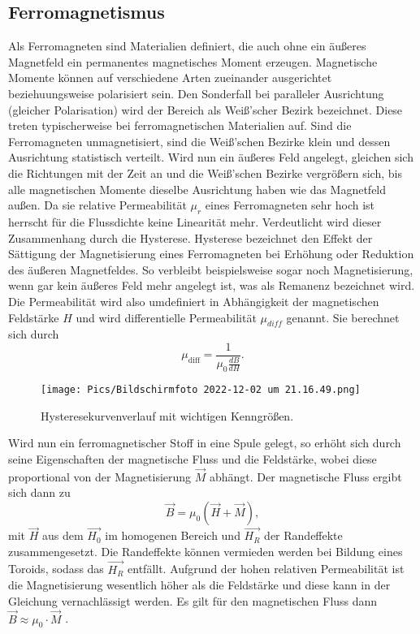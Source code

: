 \documentclass[11pt]{article}
\begin{document}
\subsection{Ferromagnetismus}
Als Ferromagneten sind Materialien definiert, die auch ohne ein äußeres Magnetfeld ein permanentes magnetisches Moment
erzeugen.
Magnetische Momente können auf verschiedene Arten zueinander ausgerichtet beziehuungsweise polarisiert sein.
Den Sonderfall bei paralleler Ausrichtung (gleicher Polarisation) wird der Bereich als Weiß'scher Bezirk bezeichnet.
Diese treten typischerweise bei ferromagnetischen Materialien auf.
Sind die Ferromagneten unmagnetisiert, sind die Weiß'schen Bezirke klein und dessen Ausrichtung statistisch verteilt.
Wird nun ein äußeres Feld angelegt, gleichen sich die Richtungen mit der Zeit an und die Weiß'schen Bezirke vergrößern sich,
bis alle magnetischen Momente dieselbe Ausrichtung haben wie das Magnetfeld außen.
Da sie relative Permeabilität $\mu_{r}$ eines Ferromagneten sehr hoch ist herrscht für die Flussdichte keine Linearität mehr.
Verdeutlicht wird dieser Zusammenhang durch die Hysterese.
Hysterese bezeichnet den Effekt der Sättigung der Magnetisierung eines Ferromagneten bei Erhöhung oder Reduktion des
äußeren Magnetfeldes.
So verbleibt beispielsweise sogar noch Magnetisierung, wenn gar kein äußeres Feld mehr angelegt ist, was als Remanenz
bezeichnet wird.
Die Permeabilität wird also umdefiniert in Abhängigkeit der magnetischen Feldstärke $H$ und wird differentielle
Permeabilität $\mu_{diff}$ genannt.
Sie berechnet sich durch
\begin{equation}
    \mu_{\text{diff}} = \frac{1}{\mu_{0}\frac{dB}{dH}} .
    \end{equation}
\begin{figure}
    \centering
    \texttt{[image: Pics/Bildschirmfoto 2022-12-02 um 21.16.49.png]}
    \caption{Hysteresekurvenverlauf mit wichtigen Kenngrößen\cite{anleitung}.}
\end{figure}
\noindent
\noindent Wird nun ein ferromagnetischer Stoff in eine Spule gelegt, so erhöht sich durch seine Eigenschaften der
magnetische Fluss und die Feldstärke, wobei diese proportional von der Magnetisierung $\vec{M}$ abhängt.
Der magnetische Fluss ergibt sich dann zu
\begin{equation}
    \vec{B} = \mu_{0}(\vec{H} + \vec{M}) ,
    \end{equation}
mit $\vec{H}$ aus dem $\vec{H_{0}}$ im homogenen Bereich und $\vec{H_{R}}$ der Randeffekte zusammengesetzt.
Die Randeffekte können vermieden werden bei Bildung eines Toroids, sodass das $\vec{H_{R}}$ entfällt.
Aufgrund der hohen relativen Permeabilität ist die Magnetisierung wesentlich höher als die Feldstärke und diese kann in
der Gleichung vernachlässigt werden.
Es gilt für den magnetischen Fluss dann $\vec{B} \approx \mu_{0} \cdot \vec{M}$ .
\end{document}
